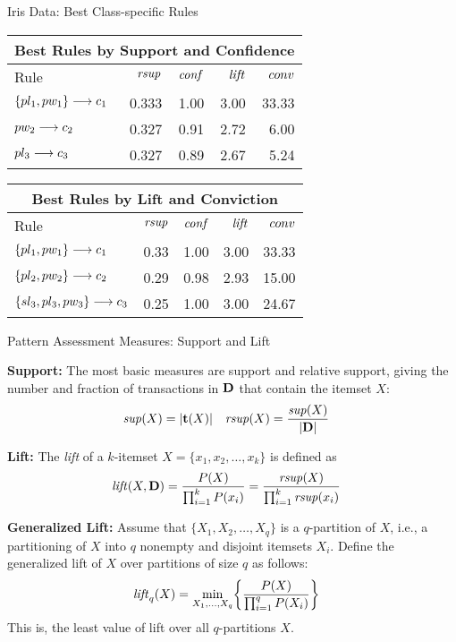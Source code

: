 \begin{frame}{Iris Data: Best Class-specific Rules}
\begin{center}
\begin{tabular}{|l|r|r|r|r|}
  \multicolumn{5}{c}{Best Rules by Support and Confidence}\\
\hline
Rule & $\mathit{rsup}$ & $\mathit{conf}$ & $\mathit{lift}$ & $conv$ \\ \hline \hline
$\{pl_1, pw_1\} \arule c_1$ & 0.333 & 1.00 & 3.00 & 33.33 \\ \hline
$pw_2 \arule c_2$           & 0.327 & 0.91 & 2.72 & 6.00 \\ \hline
$pl_3 \arule c_3$           & 0.327 & 0.89 & 2.67 & 5.24 \\ \hline
\end{tabular}%
\end{center}
\vspace{0.25in}
\begin{center}
\begin{tabular}{|l|r|r|r|r|}
  \multicolumn{5}{c}{Best Rules by Lift and Conviction}\\
\hline
Rule & $\mathit{rsup}$ & $\mathit{conf}$ & $\mathit{lift}$ & $conv$ \\ \hline \hline
$\{pl_1, pw_1\} \arule c_1$ & 0.33 & 1.00 & 3.00 & 33.33 \\ \hline
$\{pl_2, pw_2\} \arule c_2$ & 0.29 & 0.98 & 2.93 & 15.00 \\ \hline
$\{sl_3, pl_3, pw_3\} \arule c_3$ & 0.25 & 1.00 & 3.00 & 24.67 \\ \hline
\end{tabular}%
\end{center}
\end{frame}


\begin{frame}{Pattern Assessment Measures: Support and Lift}

  {\bf Support:} The most basic measures are support and relative
  support, giving the number and fraction of transactions in $\mathbf{D}$ that
  contain the itemset $X$:
\begin{align*}
  \mathit{sup}(X) & = |{\mathbf{t}}(X)| &
  \mathit{rsup}(X) & = \frac{\mathit{sup}(X)}{|\mathbf{D}|}
\end{align*}

\medskip
{\bf Lift:} The {\em lift} of a $k$-itemset
$X=\{x_1,x_2,\ldots,x_k\}$ is def\/{i}ned as
\begin{align*}
  \mathit{lift}(X, \mathbf{D}) &= \frac{P(X)}{\prod_{i=1}^k P(x_i)}
  = \frac{\mathit{rsup}(X)}{\prod_{i=1}^k \mathit{rsup}(x_i)}
\end{align*}

\medskip
{\bf Generalized Lift:} 
Assume that
$\{X_1,X_2,\ldots,X_q\}$ is a $q$-partition of $X$, i.e., a
partitioning of $X$ into $q$ nonempty and disjoint itemsets $X_i$.
Def\/{i}ne
the generalized lift of $X$ over partitions of size $q$ as
follows:
\begin{align*}
  \mathit{lift}_q(X)  & = \min_{X_1,\ldots,X_q}
  \biggl\{ \frac{P(X)}{\prod_{i=1}^q P(X_i)} \biggr\}
\end{align*}
This is, the least value of lift over all $q$-partitions
$X$.
\end{frame}


